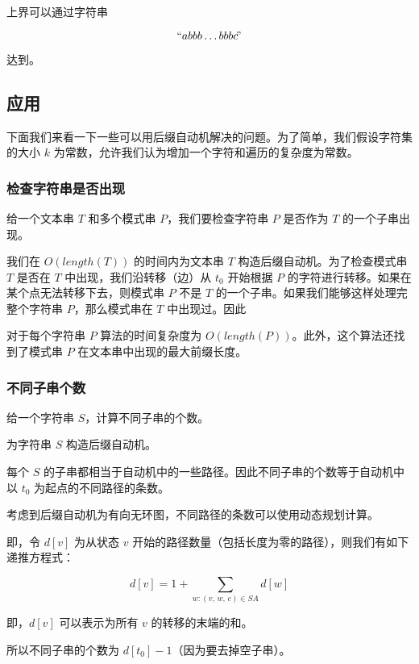上界可以通过字符串

$$
``abbb\ldots bbbc\!"
$$

达到。

\subsection{应用}

下面我们来看一下一些可以用后缀自动机解决的问题。为了简单，我们假设字符集的大小 $k$ 为常数，允许我们认为增加一个字符和遍历的复杂度为常数。

\subsubsection{检查字符串是否出现}

\begin{QUOTE}{}{}
给一个文本串 $T$ 和多个模式串 $P$，我们要检查字符串 $P$ 是否作为 $T$ 的一个子串出现。
\end{QUOTE}

我们在 $O(length(T))$ 的时间内为文本串 $T$ 构造后缀自动机。为了检查模式串 $T$ 是否在 $T$ 中出现，我们沿转移（边）从 $t_0$ 开始根据 $P$ 的字符进行转移。如果在某个点无法转移下去，则模式串 $P$ 不是 $T$ 的一个子串。如果我们能够这样处理完整个字符串 $P$，那么模式串在 $T$ 中出现过。因此

对于每个字符串 $P$ 算法的时间复杂度为 $O(length(P))$。此外，这个算法还找到了模式串 $P$ 在文本串中出现的最大前缀长度。

\subsubsection{不同子串个数}

\begin{QUOTE}{}{}
给一个字符串 $S$，计算不同子串的个数。
\end{QUOTE}

为字符串 $S$ 构造后缀自动机。

每个 $S$ 的子串都相当于自动机中的一些路径。因此不同子串的个数等于自动机中以 $t_0$ 为起点的不同路径的条数。

考虑到后缀自动机为有向无环图，不同路径的条数可以使用动态规划计算。

即，令 $d[v]$ 为从状态 $v$ 开始的路径数量（包括长度为零的路径），则我们有如下递推方程式：

$$
d[v]=1+\sum_{w:(v,\,w,\,c)\in SA}d[w]
$$

即，$d[v]$ 可以表示为所有 $v$ 的转移的末端的和。

所以不同子串的个数为 $d[t_0]-1$（因为要去掉空子串）。

